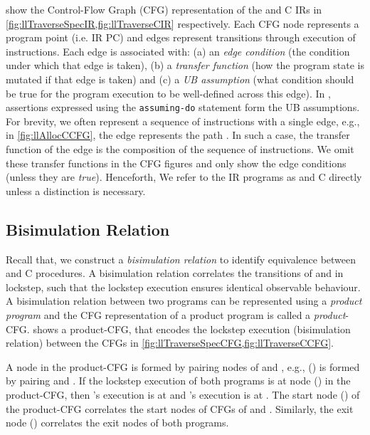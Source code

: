  show the Control-Flow Graph (CFG) representation
of the \SpecL{} and C IRs in \cref{fig:llTraverseSpecIR,fig:llTraverseCIR} respectively.
Each CFG node represents a program point (i.e. IR PC) and edges represent
transitions through execution of instructions.
Each edge is associated with:
(a) an {\em edge condition} (the condition under which that edge is taken),
(b) a {\em transfer function} (how the program state is mutated if that edge is taken) and
(c) a {\em UB assumption} (what condition should be true for the program execution
to be well-defined across this edge).
In \SpecL{}, assertions expressed using the {\tt assuming-do} statement
form the UB assumptions.
For brevity, we often represent a sequence of instructions with a single edge, e.g.,
in \cref{fig:llAllocCCFG}, the edge  represents the path .
In such a case, the transfer function of the edge is the composition of the sequence of instructions.
We omit these transfer functions in the CFG figures and only show the edge conditions (unless they are {\em true}).
Henceforth, We refer to the IR programs as \SpecL{} and C directly unless a distinction is necessary.



\subsection{Bisimulation Relation}
\label{sec:bisim}
Recall that,
we construct a {\em bisimulation relation} to identify equivalence between \SpecL{} and C procedures.
A bisimulation relation correlates the transitions of \sprog{} and \cprog{} in lockstep, such that the
lockstep execution ensures identical observable behaviour.
A bisimulation relation between two programs can be represented using a {\em product program}
\cite{covac} and the CFG representation of a product program is called a {\em product}-CFG.
 shows a product-CFG, that encodes the lockstep execution
(bisimulation relation) between the CFGs in \cref{fig:llTraverseSpecCFG,fig:llTraverseCCFG}.

A node in the product-CFG is formed by pairing nodes of \sprog{} and \cprog{},
e.g., () is formed by pairing  and .
If the lockstep execution of both programs is at node () in the product-CFG,
then \sprog{}'s execution is at  and \cprog{}'s execution is at .
The start node () of the product-CFG correlates the start nodes of CFGs of \sprog{} and \cprog{}.
Similarly, the exit node () correlates the exit nodes of both programs.

